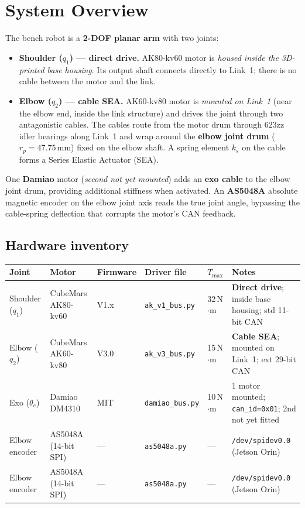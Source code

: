 \documentclass[11pt,a4paper]{article}
\begin{document}
\section{System Overview}
\label{sec:system}

The bench robot is a \textbf{2-DOF planar arm} with two joints:
\begin{itemize}[leftmargin=2em]
  \item \textbf{Shoulder ($q_1$) — direct drive.}  AK80-kv60 motor is
        \emph{housed inside the 3D-printed base housing}.  Its output shaft
        connects directly to Link~1; there is no cable between the motor and
        the link.
  \item \textbf{Elbow ($q_2$) — cable SEA.}  AK60-kv80 motor is
        \emph{mounted on Link~1} (near the elbow end, inside the link
        structure) and drives the joint through two antagonistic cables.
        The cables route from the motor drum through 623zz idler bearings
        along Link~1 and wrap around the \textbf{elbow joint drum} ($r_p{=}47.75$\,mm)
        fixed on the elbow shaft.  A spring element $k_s$ on the cable forms a
        Series Elastic Actuator (SEA).
\end{itemize}
One \textbf{Damiao} motor (\emph{second not yet mounted}) adds an
\textbf{exo cable} to the elbow joint drum, providing additional
stiffness when activated.
An \textbf{AS5048A} absolute magnetic encoder on the elbow joint axis reads
the true joint angle, bypassing the cable-spring deflection that corrupts
the motor's CAN feedback.

\subsection{Hardware inventory}

\begin{center}\small
\begin{tabular}{llllll}
\toprule
\textbf{Joint} & \textbf{Motor} & \textbf{Firmware} & \textbf{Driver file} & $T_{\max}$ & \textbf{Notes} \\
\midrule
Shoulder ($q_1$) & CubeMars AK80-kv60  & V1.x & \texttt{ak\_v1\_bus.py} & 32\,N$\cdot$m & \textbf{Direct drive}; inside base housing; std 11-bit CAN \\
Elbow ($q_2$)    & CubeMars AK60-kv80  & V3.0 & \texttt{ak\_v3\_bus.py} & 15\,N$\cdot$m & \textbf{Cable SEA}; mounted on Link~1; ext 29-bit CAN \\
Exo ($\theta_{e}$) & Damiao DM4310 & MIT  & \texttt{damiao\_bus.py} & 10\,N$\cdot$m & 1 motor mounted; \texttt{can\_id=0x01}; 2nd not yet fitted \\
Elbow encoder & AS5048A (14-bit SPI) & --- & \texttt{as5048a.py} & --- & \texttt{/dev/spidev0.0} (Jetson Orin) \\
Elbow encoder & AS5048A (14-bit SPI) & --- & \texttt{as5048a.py} & --- & \texttt{/dev/spidev0.0} (Jetson Orin) \\
\bottomrule
\end{tabular}
\end{center}
\end{document}
